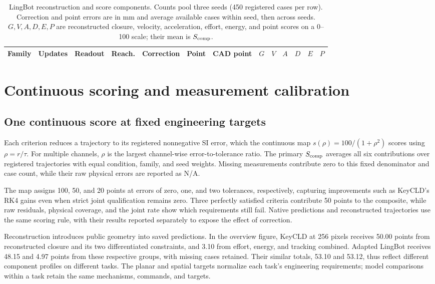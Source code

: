\documentclass[10pt,twocolumn,letterpaper]{article}
\begin{document}
\begin{table}[t]
\caption{LingBot reconstruction and score components. Counts pool three seeds (450 registered cases per row). Correction and point errors are in mm and average available cases within seed, then across seeds. $G,V,A,D,E,P$ are reconstructed closure, velocity, acceleration, effort, energy, and point scores on a 0--100 scale; their mean is $S_{\rm comp}$.}
\label{app:lingbot-components}
\centering\small
\setlength{\tabcolsep}{3.5pt}
\begin{tabular}{llrrrrrrrrrrr}
\toprule
Family & Updates & Readout & Reach. & Correction & Point & CAD point & $G$ & $V$ & $A$ & $D$ & $E$ & $P$\\
\midrule

\bottomrule
\end{tabular}
\end{table}

\section{Continuous scoring and measurement calibration}
\label{app:measurement}
\subsection{One continuous score at fixed engineering targets}
Each criterion reduces a trajectory to its registered nonnegative SI error, which the continuous map $s(\rho)=100/(1+\rho^2)$ scores using $\rho=r/\tau$. For multiple channels, $\rho$ is the largest channel-wise error-to-tolerance ratio. The primary $S_{\rm comp}$ averages all six contributions over registered trajectories with equal condition, family, and seed weights. Missing measurements contribute zero to this fixed denominator and case count, while their raw physical errors are reported as N/A.

The map assigns 100, 50, and 20 points at errors of zero, one, and two tolerances, respectively, capturing improvements such as KeyCLD's RK4 gains even when strict joint qualification remains zero. Three perfectly satisfied criteria contribute 50 points to the composite, while raw residuals, physical coverage, and the joint rate show which requirements still fail. Native predictions and reconstructed trajectories use the same scoring rule, with their results reported separately to expose the effect of correction.

Reconstruction introduces public geometry into saved predictions. In the overview figure, KeyCLD at 256 pixels receives 50.00 points from reconstructed closure and its two differentiated constraints, and 3.10 from effort, energy, and tracking combined. Adapted LingBot receives 48.15 and 4.97 points from these respective groups, with missing cases retained. Their similar totals, 53.10 and 53.12, thus reflect different component profiles on different tasks. The planar and spatial targets normalize each task's engineering requirements; model comparisons within a task retain the same mechanisms, commands, and targets.
\end{document}

